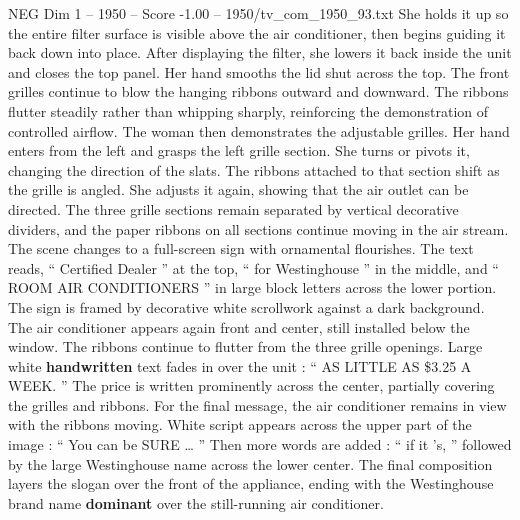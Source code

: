 \begin{textsample}{NEG Dim 1 – 1950 – Score -1.00 – 1950/tv\_com\_1950\_93.txt}
She holds it up so the entire filter surface is visible above the air conditioner, then begins guiding it back down into place.
After displaying the filter, she lowers it back inside the unit and closes the top panel.
Her hand smooths the lid shut across the top.
The front grilles continue to blow the hanging ribbons outward and downward.
The ribbons flutter steadily rather than whipping sharply, reinforcing the demonstration of controlled airflow.
The woman then demonstrates the adjustable grilles.
Her hand enters from the left and grasps the left grille section.
She turns or pivots it, changing the direction of the slats.
The ribbons attached to that section shift as the grille is angled.
She adjusts it again, showing that the air outlet can be directed.
The three grille sections remain separated by vertical decorative dividers, and the paper ribbons on all sections continue moving in the air stream.
The scene changes to a full-screen sign with ornamental flourishes.
The text reads, “ Certified Dealer ” at the top, “ for Westinghouse ” in the middle, and “ ROOM AIR CONDITIONERS ” in large block letters across the lower portion.
The sign is framed by decorative white scrollwork against a dark background.
The air conditioner appears again front and center, still installed below the window.
The ribbons continue to flutter from the three grille openings.
Large white \textbf{handwritten} text fades in over the unit : “ AS LITTLE AS \$3.25 A WEEK. ” The price is written prominently across the center, partially covering the grilles and ribbons.
For the final message, the air conditioner remains in view with the ribbons moving.
White script appears across the upper part of the image : “ You can be SURE … ” Then more words are added : “ if it ’s, ” followed by the large Westinghouse name across the lower center.
The final composition layers the slogan over the front of the appliance, ending with the Westinghouse brand name \textbf{dominant} over the still-running air conditioner.

\end{textsample}
